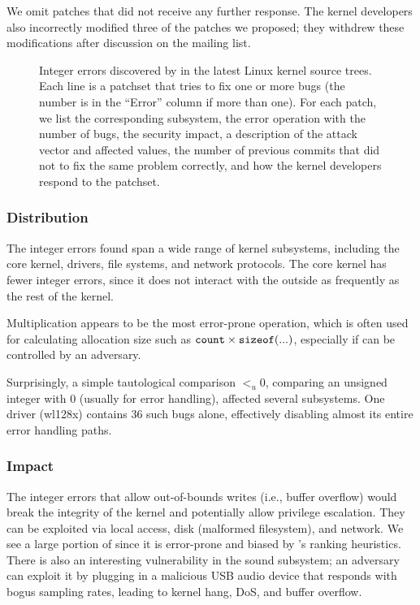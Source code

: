 We omit patches that did not receive any further response.
The kernel developers also incorrectly modified three of the patches
we proposed; they withdrew these modifications after discussion on the
mailing list.

\begin{figure*}
\centering
\footnotesize

\caption{Integer errors discovered by \sys in the latest Linux
kernel source trees.  Each line is a patchset that tries to fix one
or more bugs (the number is in the ``Error'' column if more than
one).  For each patch, we list the corresponding subsystem, the
error operation with the number of bugs, the security impact, a
description of the attack vector and affected values, the number
of previous commits that did not to fix the same problem correctly,
and how the kernel developers respond to the patchset.}
\label{f:data:linux}
\end{figure*}

\subsubsection{Distribution}

The integer errors \sys found span a wide range of kernel subsystems,
including the core kernel, drivers, file systems, and network protocols.
The core kernel has fewer integer errors, since it does not
interact with the outside as frequently as the rest of the kernel.

Multiplication appears to be the most error-prone operation, which
is often used for calculating allocation size such as $\texttt{count}
\times \texttt{sizeof}(...)$, especially if  can be controlled
by an adversary.

Surprisingly,  a simple tautological comparison $<_u 0$,
comparing an unsigned integer with 0 (usually for error handling),
affected several subsystems.
One driver (wl128x) contains 36 such bugs alone, effectively
disabling almost its entire error handling paths.

\subsubsection{Impact}

The integer errors that allow out-of-bounds writes (i.e., buffer
overflow) would break the integrity of the kernel and potentially
allow privilege escalation.  They can be exploited via local access,
disk (malformed filesystem), and network.  We see a large portion
of  since it is error-prone and biased by \sys's ranking
heuristics.
%
There is also an interesting vulnerability in the sound subsystem;
an adversary can exploit it by plugging in a malicious USB audio
device that responds with bogus sampling rates, leading to kernel
hang, DoS, and buffer overflow.

